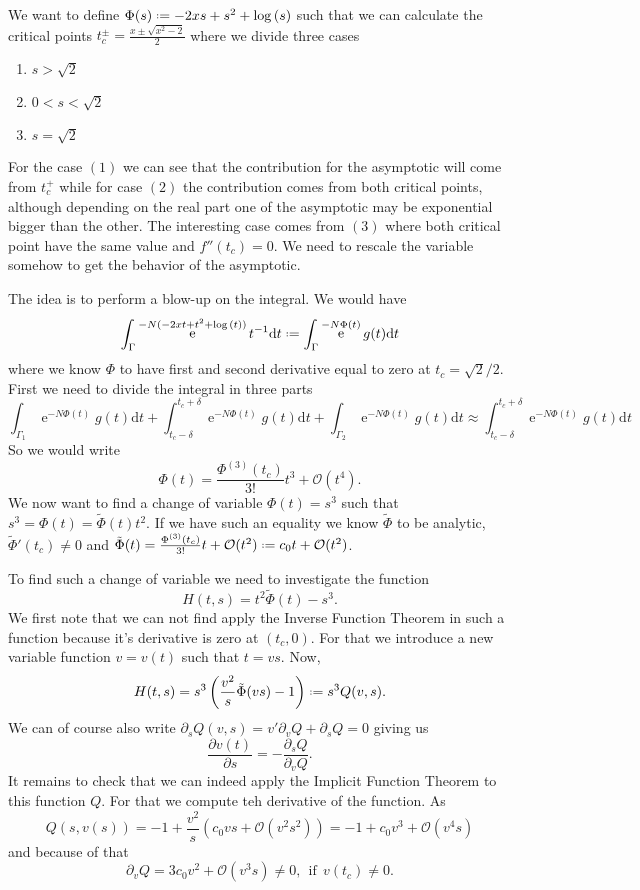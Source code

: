 \documentclass[]{report}
\DeclareMathOperator{\ee}{e}
\newcommand{\Boh}{\mathcal{O}}
\newcommand*{\deff}{\mathrel{\vcenter{\baselineskip0.5ex \lineskiplimit0pt
			\hbox{\scriptsize.}\hbox{\scriptsize.}}}%
	=}
\newcommand{\dd}{\mathrm{d}}
\numberwithin{equation}{section} %
\begin{document}
We want to define $\Phi(s) \deff -2xs + s^2 + \log{(s)}$ such that we can calculate the critical points $t_c^\pm = \frac{x \pm \sqrt{x^2 - 2}}{2}$ where we divide three cases
\begin{enumerate}
	\item $s > \sqrt{2}$
	\item $0 < s < \sqrt{2}$	
	\item $s = \sqrt{2}$
\end{enumerate}
For the case $(1)$ we can see that the contribution for the asymptotic will come from $t_c^+$ while for case $(2)$ the contribution comes from both critical points, although depending on the real part one of the asymptotic may be exponential bigger than the other. The interesting case comes from $(3)$ where both critical point have the same value and $f''(t_c) = 0$. We need to rescale the variable somehow to get the behavior of the asymptotic. 

The idea is to perform a blow-up on the integral. We would have
$$\int_{\Gamma} \ee^{-N(-2 x t + t^2 + \log{(t)})} t^{-1} \dd t \deff \int_{\Gamma} \ee^{-N\Phi(t)} g(t) \dd t $$
where we know $\Phi$ to have first and second derivative equal to zero at $t_c = \sqrt{2}/2$. First we need to divide the integral in three parts
$$ \int_{\Gamma_1} \ee^{-N\Phi(t)} g(t) \dd t + \int_{t_c - \delta}^{t_c + \delta} \ee^{-N\Phi(t)} g(t) \dd t + \int_{\Gamma_2} \ee^{-N\Phi(t)} g(t) \dd t \approx \int_{t_c - \delta}^{t_c + \delta} \ee^{-N\Phi(t)} g(t) \dd t$$
 So we would write
$$\Phi(t) = \frac{\Phi^{(3)}(t_c)}{3!} t^3 + \Boh(t^4).$$
We now want to find a change of variable $\Phi(t) = s^3$ such that $s^3 = \Phi(t) = \tilde{\Phi}(t) t^2$. If we have such an equality we know $\tilde{\Phi}$ to be analytic, $\tilde{\Phi}'(t_c) \neq 0$ and $\tilde{\Phi}(t) = \frac{\Phi^{(3)}(t_c)}{3!} t + \Boh{(t^2)} \deff c_0 t + \Boh{(t^2)}$. 

To find such a change of variable we need to investigate the function
$$H(t, s) = t^2 \tilde{\Phi}(t) - s^3.$$
We first note that we can not find apply the Inverse Function Theorem in such a function because it's derivative is zero at $(t_c, 0)$. For that we introduce a new variable function $v = v(t)$ such that $t = v s$. Now,
$$ H(t, s) = s^3 \left( \frac{v^2}{s} \tilde{\Phi}(vs) -1 \right) \deff s^3 Q(v, s) .$$
We can of course also write $\partial_s Q(v, s) = v' \partial_v Q + \partial_s Q = 0$ giving us
$$ \frac{\partial v(t)}{\partial s} = - \frac{\partial_s Q}{\partial_v Q}.$$
It remains to check that we can indeed apply the Implicit Function Theorem to this function $Q$. For that we compute teh derivative of the function. As
$$Q(s, v(s)) = -1 + \frac{v^2}{s} (c_0 vs + \Boh(v^2s^2)) = -1 + c_0v^3 + \Boh(v^4s)$$
and because of that
$$\partial_v Q = 3 c_0 v^2 + \Boh{(v^3s)} \neq 0, \ \ \text{if} \ \ v(t_c) \neq 0.$$
\end{document}
